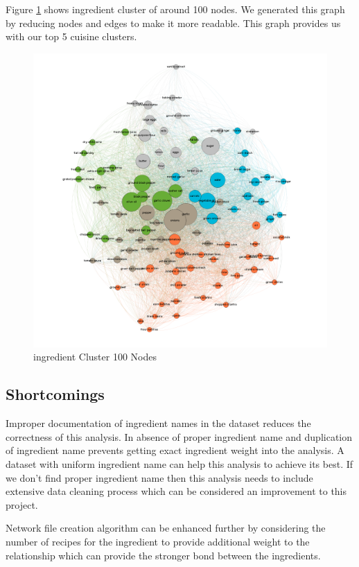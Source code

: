 \documentclass[sigconf]{acmart}
\begin{document}
Figure \ref{f:ingredient_modularity100} shows ingredient cluster of around 100 nodes. We generated this graph by reducing nodes and edges to make it more readable. This graph provides us with our top 5 cuisine clusters.  
\begin{figure}[!ht]
  \centering\includegraphics[width=\columnwidth]{images/ingredient_modularity100.png}
  \caption{ingredient Cluster 100 Nodes }\label{f:ingredient_modularity100}
\end{figure}

\subsection{Shortcomings}
Improper documentation of ingredient names in the dataset reduces the correctness of this analysis. In absence of proper ingredient name and duplication of ingredient name prevents getting exact ingredient weight into the analysis. A dataset with uniform ingredient name can help this analysis to achieve its best. If we don't find proper ingredient name then this analysis needs to include extensive data cleaning process which can be considered an improvement to this project.

Network file creation algorithm can be enhanced further by considering the number of recipes for the ingredient to provide additional weight to the relationship which can provide the stronger bond between the ingredients. 
\end{document}
